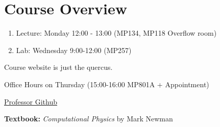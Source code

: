 
\section{Course Overview}


    \begin{enumerate}
        \item Lecture: Monday 12:00 - 13:00 (MP134, MP118 Overflow room)
        \item Lab: Wednesday 9:00-12:00 (MP257)
    \end{enumerate}

    Course website is just the quercus.

    Office Hours on Thursday (15:00-16:00 MP801A + Appointment)

    \href{https://github.com/mdiamon}{Professor Github}

    \textbf{Textbook:}\textit{ Computational Physics} by Mark Newman

